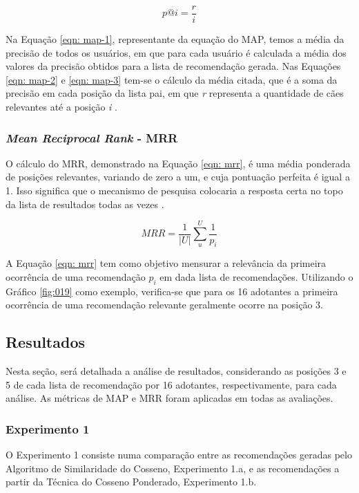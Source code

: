 \documentclass[portuguese]{textolivre}
\begin{document}
\begin{equation}
\label{eqn: map-3}
   p@i=\frac{r}{i}
\end{equation}

Na Equação \ref{eqn: map-1}, representante da equação do MAP, temos a média da precisão de todos os usuários, em que para cada usuário é calculada a média dos valores da precisão obtidos para a lista de recomendação gerada. Nas Equações \ref{eqn: map-2} e \ref{eqn: map-3} tem-se o cálculo da média citada, que é a soma da precisão em cada posição da lista pai, em que \textit{r} representa a quantidade de cães relevantes até a posição \textit{i} \cite{Silva:2019}.

\subsubsection{\textit{Mean Reciprocal  Rank} - MRR}
O cálculo do MRR, demonstrado na Equação \eqref{eqn: mrr}, é uma média ponderada de posições relevantes, variando de zero a um, e cuja pontuação perfeita é igual a 1. Isso significa que o mecanismo de pesquisa colocaria a resposta certa no topo da lista de resultados todas as vezes \cite{Azevedo:2018}.

\begin{equation}
    \label{eqn: mrr}
    MRR=\frac{1}{|U|}\sum_{u}^{U}\frac{1}{p_{i}}
\end{equation}

A Equação \eqref{eqn: mrr} tem como objetivo mensurar a relevância da primeira ocorrência de uma recomendação $p_{i}$ em dada lista de recomendações. Utilizando o Gráfico \ref{fig:019} como exemplo, verifica-se que  para os 16 adotantes a primeira ocorrência de uma recomendação relevante geralmente ocorre na posição 3.

\subsection{Resultados}

Nesta seção, será detalhada a análise de resultados, considerando as posições 3 e 5 de cada lista de recomendação por 16 adotantes, respectivamente, para cada análise. As métricas de MAP e MRR foram aplicadas em todas as avaliações.


\subsubsection{Experimento 1}

O Experimento 1 consiste numa comparação entre as recomendações geradas pelo Algoritmo de Similaridade do Cosseno, Experimento 1.a, e as recomendações a partir da Técnica do Cosseno Ponderado, Experimento 1.b.
\end{document}
